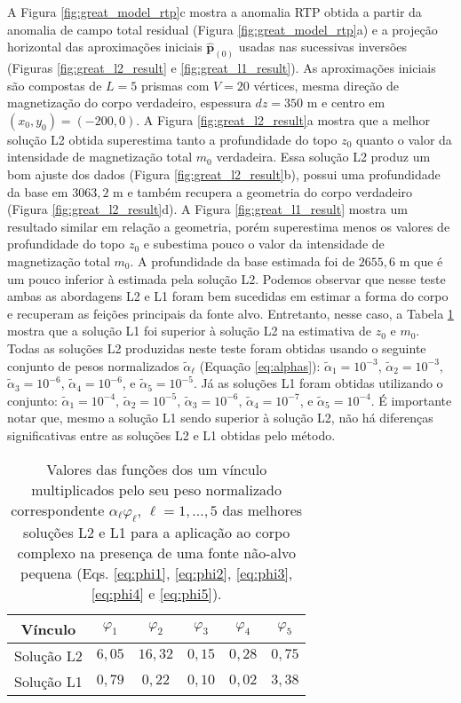 A Figura \ref{fig:great_model_rtp}c mostra a anomalia RTP obtida a partir da anomalia de campo total residual (Figura \ref{fig:great_model_rtp}a) e 
a projeção horizontal das aproximações iniciais $\hat{\mathbf{p}}_{(0)}$ 
usadas nas sucessivas inversões (Figuras \ref{fig:great_l2_result} e 
\ref{fig:great_l1_result}).
As aproximações iniciais são compostas de $ L= 5$ prismas com $ V = 20 $ vértices, mesma direção de magnetização do corpo verdadeiro, espessura $ dz=350 $ m e centro em $ (x_0, y_0) = (-200, 0) $.
A Figura \ref{fig:great_l2_result}a mostra que a melhor solução L2 obtida superestima tanto a profundidade do topo $z_{0}$ quanto o valor da intensidade de magnetização total $m_{0}$ verdadeira. Essa solução L2 produz um bom ajuste dos dados (Figura \ref{fig:great_l2_result}b), possui uma profundidade da base em $3063,2$ m e também recupera a geometria do corpo verdadeiro (Figura \ref{fig:great_l2_result}d).
A Figura \ref{fig:great_l1_result} mostra um resultado similar em relação a geometria, porém superestima menos os valores de profundidade do topo $z_{0}$ e subestima pouco o valor da intensidade de magnetização total $m_{0}$. A profundidade da base estimada foi de $2655,6$ m que é um pouco inferior à estimada pela solução L2.
Podemos observar que nesse teste ambas as abordagens L2 e L1 foram bem sucedidas em estimar a forma do corpo e recuperam as feições principais da fonte alvo. Entretanto, nesse caso, a Tabela \ref{tab:inc-reg} mostra que a solução L1 foi superior à solução L2 na estimativa de $ z_0 $ e $ m_0 $.
Todas as soluções L2 produzidas neste teste foram obtidas usando o seguinte conjunto de pesos normalizados $\tilde{\alpha}_{\ell}$ (Equação \ref{eq:alphas}): 
$\tilde{\alpha}_{1} = 10^{-3}$, $\tilde{\alpha}_{2} = 10^{-3}$, 
$\tilde{\alpha}_{3} = 10^{-6}$, $\tilde{\alpha}_{4} = 10^{-6}$, e 
$\tilde{\alpha}_{5} = 10^{-5}$. 
Já as soluções L1 foram obtidas utilizando o conjunto: 
$\tilde{\alpha}_{1} = 10^{-4}$, $\tilde{\alpha}_{2} = 10^{-5}$, 
$\tilde{\alpha}_{3} = 10^{-6}$, $\tilde{\alpha}_{4} = 10^{-7}$, e 
$\tilde{\alpha}_{5} = 10^{-4}$.
É importante notar que, mesmo a solução L1 sendo superior à solução L2, não há diferenças significativas entre as soluções L2 e L1 obtidas pelo método.

\begin{table}[h]\label{tab:inc-reg}
	\caption{Valores das funções dos um vínculo multiplicados pelo seu peso normalizado correspondente $ \alpha_\ell \varphi_\ell  $, $ \ell=1,\dots,5 $ das melhores soluções L2 e L1 para a aplicação ao corpo complexo na presença de uma fonte não-alvo pequena (Eqs. \ref{eq:phi1}, \ref{eq:phi2}, \ref{eq:phi3}, \ref{eq:phi4} e \ref{eq:phi5}).}
	\centering
	\vspace{0.5cm}
	\begin{tabular}{c|ccccc}
		Vínculo & $ \varphi _1 $ & $ \varphi _2 $ &  $ \varphi _3 $ &  $ \varphi _4 $ &  $ \varphi _5 $ \\
		\hline
		Solução L2 & $ 6,05 $ & $ 16,32 $ & $ 0,15 $ & $0,28 $ & $ 0,75 $ \\ 
		Solução L1 & $ 0,79 $ & $ 0,22 $ & $ 0,10 $ & $0,02$ & $ 3,38$
	\end{tabular}
\end{table}

